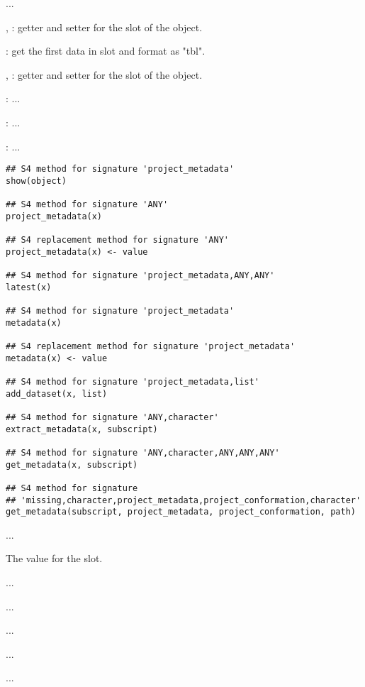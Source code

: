\documentclass[letterpaper]{book}
\begin{document}
%
\begin{Description}\relax
...

, : getter and setter
for the  slot of the object.

: get the first data in  slot and
format as "tbl".

, : getter and setter
for the  slot of the object.

: ...

: ...

: ...
\end{Description}
%
\begin{Usage}
\begin{verbatim}
## S4 method for signature 'project_metadata'
show(object)

## S4 method for signature 'ANY'
project_metadata(x)

## S4 replacement method for signature 'ANY'
project_metadata(x) <- value

## S4 method for signature 'project_metadata,ANY,ANY'
latest(x)

## S4 method for signature 'project_metadata'
metadata(x)

## S4 replacement method for signature 'project_metadata'
metadata(x) <- value

## S4 method for signature 'project_metadata,list'
add_dataset(x, list)

## S4 method for signature 'ANY,character'
extract_metadata(x, subscript)

## S4 method for signature 'ANY,character,ANY,ANY,ANY'
get_metadata(x, subscript)

## S4 method for signature 
## 'missing,character,project_metadata,project_conformation,character'
get_metadata(subscript, project_metadata, project_conformation, path)
\end{verbatim}
\end{Usage}
%
\begin{Arguments}
\begin{ldescription}
\item[\code{x}] ...

\item[\code{value}] The value for the slot.

\item[\code{list}] ...

\item[\code{subscript}] ...

\item[\code{project\_metadata}] ...

\item[\code{project\_conformation}] ...

\item[\code{path}] ...
\end{ldescription}
\end{Arguments}
\end{document}
